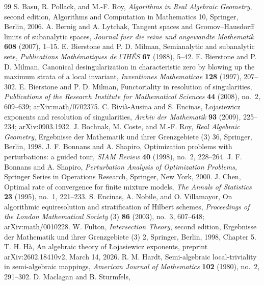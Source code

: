 \begin{thebibliography}{99}
 S. Basu, R. Pollack, and M.-F. Roy,
\emph{Algorithms in Real Algebraic Geometry}, second edition,
Algorithms and Computation in Mathematics 10, Springer, Berlin, 2006.
 A. Bernig and A. Lytchak,
Tangent spaces and Gromov--Hausdorff limits of subanalytic spaces,
\emph{Journal fuer die reine und angewandte Mathematik}
\textbf{608} (2007), 1--15.
 E. Bierstone and P. D. Milman,
Semianalytic and subanalytic sets,
\emph{Publications Math\'ematiques de l'IH\'ES} \textbf{67} (1988), 5--42.
 E. Bierstone and P. D. Milman,
Canonical desingularization in characteristic zero by blowing up the
maximum strata of a local invariant,
\emph{Inventiones Mathematicae} \textbf{128} (1997), 207--302.
 E. Bierstone and P. D. Milman,
Functoriality in resolution of singularities,
\emph{Publications of the Research Institute for Mathematical Sciences}
\textbf{44} (2008), no.~2, 609--639; arXiv:math/0702375.
 C. Bivi\`a-Ausina and S. Encinas,
\L{}ojasiewicz exponents and resolution of singularities,
\emph{Archiv der Mathematik} \textbf{93} (2009), 225--234;
arXiv:0903.1932.
 J. Bochnak, M. Coste, and M.-F. Roy,
\emph{Real Algebraic Geometry}, Ergebnisse der Mathematik und ihrer
Grenzgebiete (3) 36, Springer, Berlin, 1998.
 J. F. Bonnans and A. Shapiro,
Optimization problems with perturbations: a guided tour,
\emph{SIAM Review} \textbf{40} (1998), no.~2, 228--264.
 J. F. Bonnans and A. Shapiro,
\emph{Perturbation Analysis of Optimization Problems},
Springer Series in Operations Research, Springer, New York, 2000.
 J. Chen,
Optimal rate of convergence for finite mixture models,
\emph{The Annals of Statistics} \textbf{23} (1995), no.~1, 221--233.
 S. Encinas, A. Nobile, and O. Villamayor,
On algorithmic equiresolution and stratification of Hilbert schemes,
\emph{Proceedings of the London Mathematical Society} (3)
\textbf{86} (2003), no.~3, 607--648; arXiv:math/0010228.
 W. Fulton,
\emph{Intersection Theory}, second edition,
Ergebnisse der Mathematik und ihrer Grenzgebiete (3) 2,
Springer, Berlin, 1998, Chapter 5.
 T. H. H\`a,
An algebraic theory of \L{}ojasiewicz exponents,
preprint arXiv:2602.18410v2, March 14, 2026.
 R. M. Hardt,
Semi-algebraic local-triviality in semi-algebraic mappings,
\emph{American Journal of Mathematics} \textbf{102} (1980), no.~2, 291--302.
 D. Maclagan and B. Sturmfels,

\end{thebibliography}
